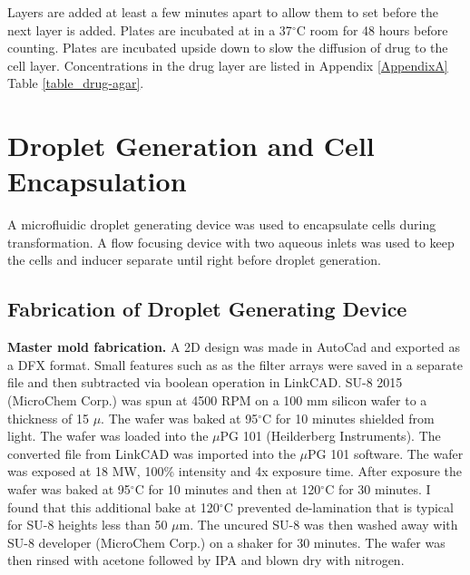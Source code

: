 Layers are added at least a few minutes apart to allow them to set before the next layer is added.
Plates are incubated at in a 37$^{\circ}$C room for 48 hours before counting.
Plates are incubated upside down to slow the diffusion of drug to the cell layer.
Concentrations in the drug layer are listed in Appendix \ref{AppendixA} Table \ref{table_drug-agar}.

\section{Droplet Generation and Cell Encapsulation}

A microfluidic droplet generating device was used to encapsulate cells during transformation.
A flow focusing device with two aqueous inlets was used to keep the cells and inducer separate until right before droplet generation.

\subsection{Fabrication of Droplet Generating Device}

\textbf{Master mold fabrication.} A 2D design was made in AutoCad and exported as a DFX format.
Small features such as as the filter arrays were saved in a separate file and then subtracted via boolean operation in LinkCAD.
SU-8 2015 (MicroChem Corp.) was spun at 4500 RPM on a 100 mm silicon wafer to a thickness of 15 $\mu$.
The wafer was baked at 95$^{\circ}$C for 10 minutes shielded from light.
The wafer was loaded into the $\mu$PG 101 (Heilderberg Instruments).
The converted file from LinkCAD was imported into the $\mu$PG 101 software.
The wafer was exposed at 18 MW, 100\% intensity and 4x exposure time.
After exposure the wafer was baked at 95$^{\circ}$C for 10 minutes and then at 120$^{\circ}$C for 30 minutes.
I found that this additional bake at 120$^{\circ}$C prevented de-lamination that is typical for SU-8 heights less than 50 $\mu$m.
The uncured SU-8 was then washed away with SU-8 developer (MicroChem Corp.) on a shaker for 30 minutes.
The wafer was then rinsed with acetone followed by IPA and blown dry with nitrogen.

